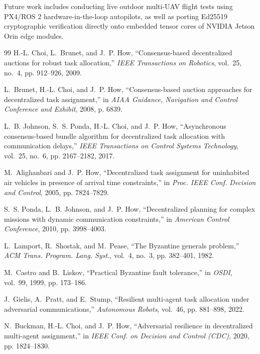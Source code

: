 \documentclass[journal,10pt,twocolumn]{IEEEtran}
\begin{document}
Future work includes conducting live outdoor multi-UAV flight tests using PX4/ROS 2 hardware-in-the-loop autopilots, as well as porting Ed25519 cryptographic verification directly onto embedded tensor cores of NVIDIA Jetson Orin edge modules.

\balance

\begin{thebibliography}{99}
H.-L. Choi, L.~Brunet, and J.~P. How, ``Consensus-based decentralized auctions for robust task allocation,'' \emph{IEEE Transactions on Robotics}, vol.~25, no.~4, pp. 912--926, 2009.

L.~Brunet, H.-L. Choi, and J.~P. How, ``Consensus-based auction approaches for decentralized task assignment,'' in \emph{AIAA Guidance, Navigation and Control Conference and Exhibit}, 2008, p. 6839.

L.~B. Johnson, S.~S. Ponda, H.-L. Choi, and J.~P. How, ``Asynchronous consensus-based bundle algorithm for decentralized task allocation with communication delays,'' \emph{IEEE Transactions on Control Systems Technology}, vol.~25, no.~6, pp. 2167--2182, 2017.

M.~Alighanbari and J.~P. How, ``Decentralized task assignment for uninhabited air vehicles in presence of arrival time constraints,'' in \emph{Proc. IEEE Conf. Decision and Control}, 2005, pp. 7824--7829.

S.~S. Ponda, L.~B. Johnson, and J.~P. How, ``Decentralized planning for complex missions with dynamic communication constraints,'' in \emph{American Control Conference}, 2010, pp. 3998--4003.

L.~Lamport, R.~Shostak, and M.~Pease, ``The Byzantine generals problem,'' \emph{ACM Trans. Program. Lang. Syst.}, vol.~4, no.~3, pp. 382--401, 1982.

M.~Castro and B.~Liskov, ``Practical Byzantine fault tolerance,'' in \emph{OSDI}, vol.~99, 1999, pp. 173--186.

J.~Gielis, A.~Pratt, and E.~Stump, ``Resilient multi-agent task allocation under adversarial communications,'' \emph{Autonomous Robots}, vol.~46, pp. 881--898, 2022.

N.~Buckman, H.-L. Choi, and J.~P. How, ``Adversarial resilience in decentralized multi-agent assignment,'' in \emph{IEEE Conf. on Decision and Control (CDC)}, 2020, pp. 1824--1830.


\end{thebibliography}
\end{document}
